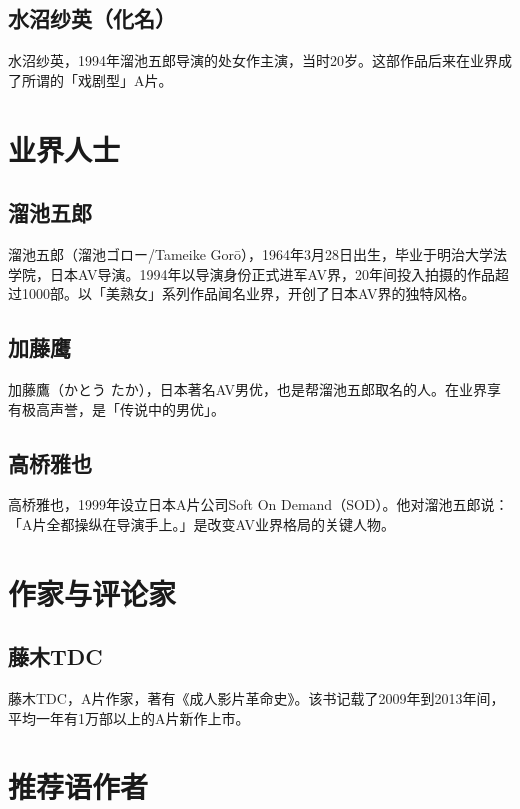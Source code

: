 \documentclass[12pt,UTF8]{ctexbook}
\begin{document}
\subsection{水沼纱英（化名）}

水沼纱英，1994年溜池五郎导演的处女作主演，当时20岁。这部作品后来在业界成了所谓的「戏剧型」A片。

\section{业界人士}

\subsection{溜池五郎}

溜池五郎（溜池ゴロー/Tameike Gorō），1964年3月28日出生，毕业于明治大学法学院，日本AV导演。1994年以导演身份正式进军AV界，20年间投入拍摄的作品超过1000部。以「美熟女」系列作品闻名业界，开创了日本AV界的独特风格。

\subsection{加藤鹰}

加藤鷹（かとう たか），日本著名AV男优，也是帮溜池五郎取名的人。在业界享有极高声誉，是「传说中的男优」。

\subsection{高桥雅也}

高桥雅也，1999年设立日本A片公司Soft On Demand（SOD）。他对溜池五郎说：「A片全都操纵在导演手上。」是改变AV业界格局的关键人物。

\section{作家与评论家}

\subsection{藤木TDC}

藤木TDC，A片作家，著有《成人影片革命史》。该书记载了2009年到2013年间，平均一年有1万部以上的A片新作上市。

\section{推荐语作者}
\end{document}
